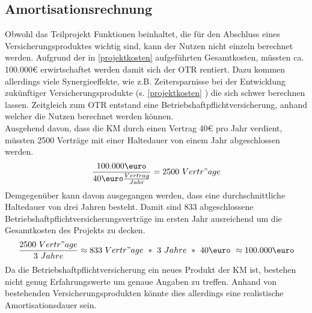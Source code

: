 \subsection{Amortisationsrechnung}
\label{amortisationsdauer}
Obwohl das Teilprojekt Funktionen beinhaltet, die für den Abschluss eines Versicherungsproduktes wichtig sind, kann der Nutzen nicht einzeln berechnet werden. Aufgrund der in \ref{projektkosten}  aufgeführten Gesamtkosten, müssten ca. 100.000€ erwirtschaftet werden damit sich der \ac{OTR} rentiert. Dazu kommen allerdings viele Synergieeffekte, wie z.B. Zeitersparnisse bei der Entwicklung zukünftiger Versicherungsprodukte (s. \ref{projektkosten} ) die sich schwer berechnen lassen. Zeitgleich zum \ac{OTR} entstand eine Betriebshaftpflichtversicherung, anhand welcher die Nutzen berechnet werden können.\\
Ausgehend davon, dass die \ac{KM} durch einen Vertrag 40€ pro Jahr verdient, müssten 2500 Verträge mit einer Haltedauer von einem Jahr abgeschlossen werden.\\
\begin{equation}
	\frac{100.000\mbox{\euro}}{40\mbox{\euro}\frac{Vertrag}{Jahr}} = 2500\ Vertr"age \\
\end{equation}
Demgegenüber kann davon ausgegangen werden, dass eine durchschnittliche Haltedauer von drei Jahren besteht. Damit sind 833 abgeschlossene Betriebshaftpflichtversicherungsverträge im ersten Jahr ausreichend um die Gesamtkosten des Projekts zu decken.
\begin{equation}
	 \frac{2500\ Vertr"age}{3\ Jahre} \approx833\ Vertr"age\ *\ 3\ Jahre\ *\ 40\mbox{\euro}\ \approx100.000\mbox{\euro} \\
\end{equation}
 Da die Betriebshaftpflichtversicherung ein neues Produkt der \ac{KM} ist, bestehen nicht genug Erfahrungswerte um genaue Angaben zu treffen. Anhand von bestehenden Versicherungsprodukten könnte dies allerdings eine realistische Amortisationsdauer sein.

